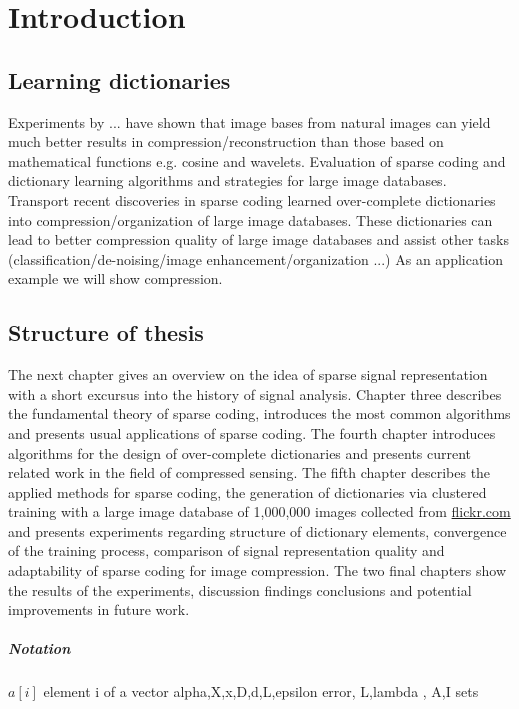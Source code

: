 \chapter{Introduction}
\label{sec:introduction}
\section{Learning dictionaries} %





Experiments by ... have shown that image bases from natural
images can yield much better results in compression/reconstruction than
those based on mathematical functions e.g. cosine and
wavelets.\cite{Elad2006,Mairal2010}
Evaluation of sparse coding and dictionary learning algorithms and strategies
for large image databases.
Transport recent discoveries in sparse coding learned over-complete
dictionaries into compression/organization of large image databases.
These dictionaries can lead to better compression quality of large
image databases and assist other tasks (classification/de-noising/image
enhancement/organization ...)
As an application example we will show compression.

\section{Structure of thesis}
The next chapter gives an overview on the idea of sparse signal
representation with a short excursus into the history of signal analysis.
Chapter 
three describes the fundamental theory of sparse coding, introduces the most
common algorithms and presents usual applications of sparse coding. The fourth
chapter introduces algorithms for the design of over-complete dictionaries and
presents current related work in the field of compressed sensing. The fifth
chapter describes the applied methods for sparse coding, the generation of
dictionaries via clustered training with a large image database of 1,000,000
images collected from \url{flickr.com} and presents experiments regarding
structure of dictionary elements, convergence of the training process,
comparison of signal representation quality and adaptability of sparse coding
for image compression. The two final chapters show the results of the
experiments, discussion findings conclusions and potential improvements in
future work. 

\paragraph{Notation}
$a[i]$ element i of a vector
alpha,X,x,D,d,L,epsilon error, L,lambda , A,I sets


